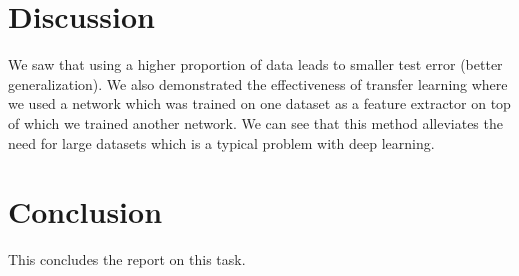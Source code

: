 \documentclass[11pt]{article}
\begin{document}
\section{Discussion}
We saw that using a higher proportion of data leads to smaller test error (better generalization). 
We also demonstrated the effectiveness of transfer learning where we used a network which was trained on 
one dataset as a feature extractor on top of which we trained another network. We can see that this 
method alleviates the need for large datasets which is a typical problem with deep learning.



\section{Conclusion}
This concludes the report on this task.
\end{document}
